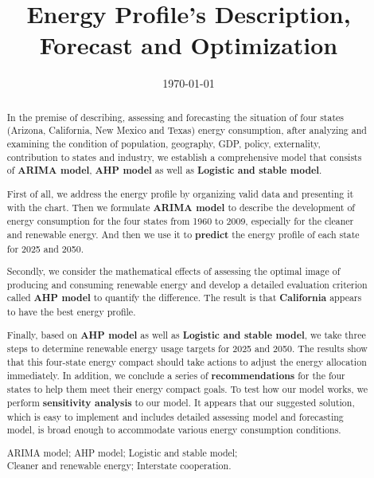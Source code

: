 \documentclass{mcmthesis}
\title{\large \bf{Energy Profile's Description, Forecast and Optimization}}
\author{ }
\date{\today}
\begin{document}
\begin{abstract}

In the premise of describing, assessing and forecasting the situation of four states (Arizona, California, New Mexico and Texas) energy consumption, after analyzing and examining the condition of population, geography, GDP, policy, externality, contribution to states and industry, we establish a comprehensive model that consists of {\bf{ARIMA model}}, {\bf{AHP model}} as well as {\bf{Logistic and stable model}}.

First of all, we address the energy profile by organizing valid data and presenting it with the chart. Then we formulate {\bf{ARIMA model}} to describe the development of energy consumption for the four states from 1960 to 2009, especially for the cleaner and renewable energy. And then we use it to {\bf{predict}} the energy profile of each state for 2025 and 2050.

Secondly, we consider the mathematical effects of assessing the optimal image of producing and consuming renewable energy and develop a detailed evaluation criterion called {\bf{AHP model}} to quantify the difference. The result is that {\bf{California}} appears to have the best energy profile.

Finally, based on {\bf{AHP model}} as well as {\bf{Logistic and stable model}}, we take three steps to determine renewable energy usage targets for 2025 and 2050. The results show that this four-state energy compact should take actions to adjust the energy allocation immediately. In addition, we conclude a series of {\bf{recommendations}} for the four states to help them meet their energy compact goals. To test how our model works, we perform {\bf{sensitivity analysis}} to our model. It appears that our suggested solution, which is easy to implement and includes detailed assessing model and forecasting model, is broad enough to accommodate various energy consumption conditions.

\begin{keywords}
ARIMA model; AHP model; Logistic and stable model; \\ \hspace*{1.2cm} Cleaner and renewable energy; Interstate cooperation.
\end{keywords}
\end{abstract}

\maketitle
\newpage                                                          %
\begin{adjustwidth}{-1cm}{0cm}

\setcounter{tocdepth}{3}
\thispagestyle{empty}
\tableofcontents                                                  %

\end{adjustwidth}
\end{document}

